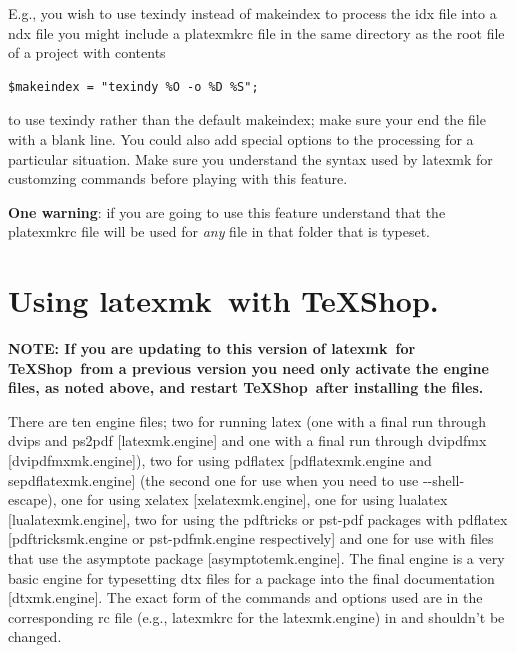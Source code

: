 \documentclass[11pt]{article}
\newcommand{\cmd}[1]{\textsf{#1}}
\newcommand{\TS}{\textsf{\TeX Shop}}
\newcommand{\latexmk}{\textsf{latexmk}}
\begin{document}
E.g., you wish to use \cmd{texindy} instead of \cmd{makeindex} to process the \cmd{idx} file into a \cmd{ndx} file you might include a \cmd{platexmkrc} file in the same directory as the root file of a project with contents
\begin{verbatim}
$makeindex = "texindy %O -o %D %S";
\end{verbatim}
to use \cmd{texindy} rather than the default \cmd{makeindex}; make sure your end the file with a blank line. You could also add special options to the processing for a particular situation. Make sure you understand the syntax used by \cmd{latexmk} for customzing commands before playing with this feature.

\textbf{One warning}: if you are going to use this feature understand that the \cmd{platexmkrc} file will be used for \emph{any} file in that folder that is typeset.

\section{Using \latexmk\ with \TS.}

\textbf{NOTE: If you are updating to this version of \latexmk\ for \TS\ from a previous version you need only activate the engine files, as noted above, and restart \TS\ after installing the files.}

There are ten \cmd{engine} files; two for running \cmd{latex} (one with a final run through \cmd{dvips} and \cmd{ps2pdf} [\cmd{latexmk.engine}] and one with a final run through \cmd{dvipdfmx} [\cmd{dvipdfmxmk.engine]}), two for using \cmd{pdflatex} [\cmd{pdflatexmk.engine} and \cmd{sepdflatexmk.engine}] (the second one for use when you need to use \cmd{-{}-shell-escape}), one for using \cmd{xelatex} [\cmd{xelatexmk.engine}], one for using \cmd{lualatex} [\cmd{lualatexmk.engine}], two for using the \cmd{pdftricks} or \cmd{pst-pdf} packages with \cmd{pdflatex} [\cmd{pdftricksmk.engine} or \cmd{pst-pdfmk.engine} respectively] and one for use with files that use the \cmd{asymptote} package [\cmd{asymptotemk.engine}]. The final engine is a very basic engine for typesetting \cmd{dtx} files for a package into the final documentation [\cmd{dtxmk.engine}]. The exact form of the commands and options used are in the corresponding \cmd{rc} file (e.g., \cmd{latexmkrc} for the \cmd{latexmk.engine}) in  and shouldn't be changed.
\end{document}
